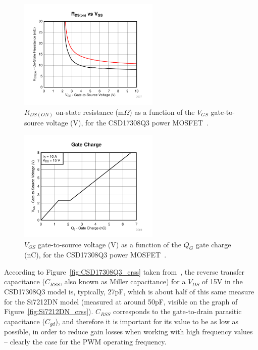 \begin{figure}[h]
	\centering
	\includegraphics[width=0.6\textwidth]{Chapters/Figures/chapter3/CSD17308Q3_rdson.pdf}
	\caption{$R_{DS(ON)}$ on-state resistance (m$\Omega$) as a function of the $V_{GS}$ gate-to-source voltage (V), for the CSD17308Q3 power MOSFET~\cite{CSD17308Q3}.}
	\label{fig:CSD17308Q3_rdson}
\end{figure}
\begin{figure}[h]
	\centering
	\includegraphics[width=0.6\textwidth]{Chapters/Figures/chapter3/CSD17308Q3_gate_charge.pdf}
	\caption{$V_{GS}$ gate-to-source voltage (V) as a function of the $Q_G$ gate charge (nC), for the CSD17308Q3 power MOSFET~\cite{CSD17308Q3}.}
	\label{fig:CSD17308Q3_gate_charge}
\end{figure}

According to Figure~\ref{fig:CSD17308Q3_crss} taken from~\cite{CSD17308Q3}, the reverse transfer capacitance ($C_{RSS}$, also known as Miller capacitance) for a $V_{DS}$ of 15V in the CSD17308Q3 model is, typically, 27pF, which is about half of this same measure for the Si7212DN model (measured at around 50pF, visible on the graph of Figure~\ref{fig:Si7212DN_crss}). $C_{RSS}$ corresponds to the gate-to-drain parasitic capacitance ($C_{gd}$), and therefore it is important for its value to be as low as possible, in order to reduce gain losses when working with high frequency values -- clearly the case for the PWM operating frequency.


